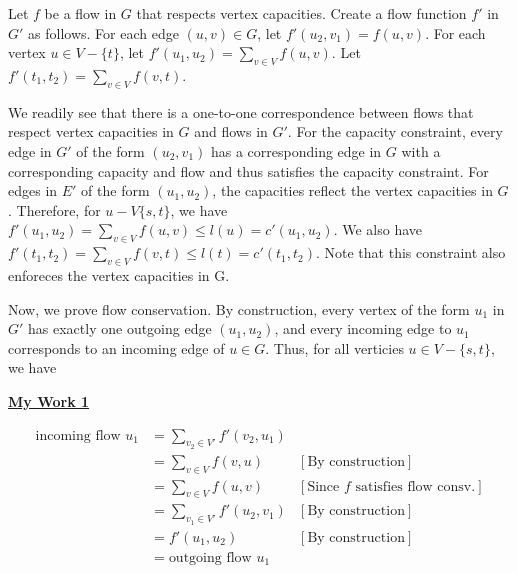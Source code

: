 \documentclass[12pt]{article}
\begin{document}
\begin{enumerate}[1.]
\begin{enumerate}[a)]
        Let $f$ be a flow in $G$ that respects vertex capacities. Create a flow function
        $f'$ in $G'$ as follows. For each edge $(u,v) \in G$, let $f'(u_2, v_1) = f(u,v)$.
        For each vertex $u \in V - \{t\}$, let $f'(u_1, u_2) = \sum\limits_{v \in V} f(u,v)$.
        Let $f'(t_1, t_2) = \sum\limits_{v \in V} f(v,t)$.

        \bigskip

        We readily see that there is a one-to-one correspondence between flows that respect
        vertex capacities in $G$ and flows in $G'$. For the capacity constraint, every edge
        in $G'$ of the form $(u_2, v_1)$ has a corresponding edge in $G$ with a corresponding
        capacity and flow and thus satisfies the capacity constraint. For edges in $E'$ of
        the form $(u_1, u_2)$, the capacities reflect the vertex capacities in $G$. Therefore,
        for $u - V \{s,t\}$, we have $f'(u_1, u_2) = \sum\limits_{v \in V} f(u,v) \leq l(u) = c'(u_1, u_2)$.
        We also have $f'(t_1, t_2) = \sum\limits_{v \in V} f(v,t) \leq l(t) = c'(t_1, t_2)$. Note
        that this constraint also enforeces the vertex capacities in G.

        \bigskip

        Now, we prove flow conservation. By construction, every vertex of the form $u_1$
        in $G'$ has exactly one outgoing edge $(u_1, u_2)$, and every incoming edge to $u_1$
        corresponds to an incoming edge of $u \in G$. Thus, for all verticies $u \in V - \{s,t\}$,
        we have

        \bigskip

        \begin{mdframed}
        \underline{\textbf{My Work 1}}

        \begin{align}
        \text{incoming flow $u_1$} &= \sum\limits_{v_2 \in V'} f'(v_2, u_1)\\
        &= \sum\limits_{v \in V} f(v,u) & [\text{By construction}]\\
        &= \sum\limits_{v \in V} f(u,v) & [\text{Since $f$ satisfies flow consv.}]\\
        &= \sum\limits_{v_1 \in V'} f'(u_2,v_1) & [\text{By construction}]\\
        &= f'(u_1,u_2) & [\text{By construction}]\\
        &= \text{outgoing flow $u_1$}
        \end{align}

        \end{mdframed}


\end{enumerate}
\end{enumerate}
\end{document}
